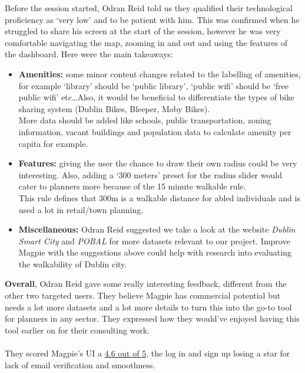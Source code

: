 \noindent Before the session started, Odran Reid told us they qualified their technological proficiency as `very low' and to be patient with him. This was confirmed when he struggled to share his screen at the start of the session, however he was very comfortable navigating the map, zooming in and out and using the features of the dashboard. Here were the main takeaways:
\begin{itemize}
    \item \textbf{Amenities:} some minor content changes related to the labelling of amenities, for example `library' should be `public library', `public wifi' should be `free public wifi' etc\ldots Also, it would be beneficial to differentiate the types of bike sharing system (Dublin Bikes, Bleeper, Moby Bikes).\\ More data should be added like schools, public transportation, zoning information, vacant buildings and population data to calculate amenity per capita for example.\\
    \item \textbf{Features:} giving the user the chance to draw their own radius could be very interesting. Also, adding a `300 meters' preset for the radius slider would cater to planners more because of the 15 minute walkable rule.\\ This rule defines that 300m is a walkable distance for abled individuals and is used a lot in retail/town planning.\\
    \item \textbf{Miscellaneous:} Odran Reid suggested we take a look at the website \emph{Dublin Smart City} and \emph{POBAL} for more datasets relevant to our project. Improve Magpie with the suggestions above could help with research into evaluating the walkability of Dublin city.
\end{itemize}
\textbf{Overall}, Odran Reid gave some really interesting feedback, different from the other two targeted users. They believe Magpie has commercial potential but needs a lot more datasets and a lot more details to turn this into the go-to tool for planners in any sector. They expressed how they would've enjoyed having this tool earlier on for their consulting work.\\ \\
They scored Magpie's UI a \underline{4.6 out of 5}, the log in and sign up losing a star for lack of email verification and smoothness.
